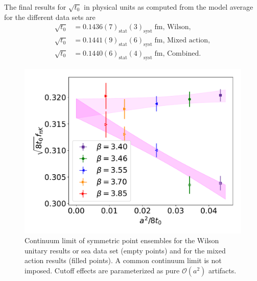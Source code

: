 The final results for $\sqrt{t_0}$ in physical units as computed from the model average for the different data sets are
\begin{align}
\label{ch_ss:eq:t0ph}
\sqrt{t_0}&=0.1436(7)_{\textrm{stat}}(3)_{\textrm{syst}}\;\textrm{fm, Wilson}, \\
\sqrt{t_0}&=0.1441(9)_{\textrm{stat}}(6)_{\textrm{syst}}\;\textrm{fm, Mixed action}, \\
\sqrt{t_0}&=0.1440(6)_{\textrm{stat}}(4)_{\textrm{syst}}\;\textrm{fm, Combined}.
\end{align}

\begin{figure}
    \centering
    \includegraphics[width=.7\textwidth]{./cap5/figs/continuum_sym.pdf}
    \caption{Continuum limit of symmetric point ensembles for the Wilson unitary results or sea data set (empty points) and for the mixed action results (filled points). A common continuum limit is not imposed. Cutoff effects are parameterized as pure $\mathcal{O}(a^2)$ artifacts.}
    \label{ch_ss:fig:universality}
\end{figure}

